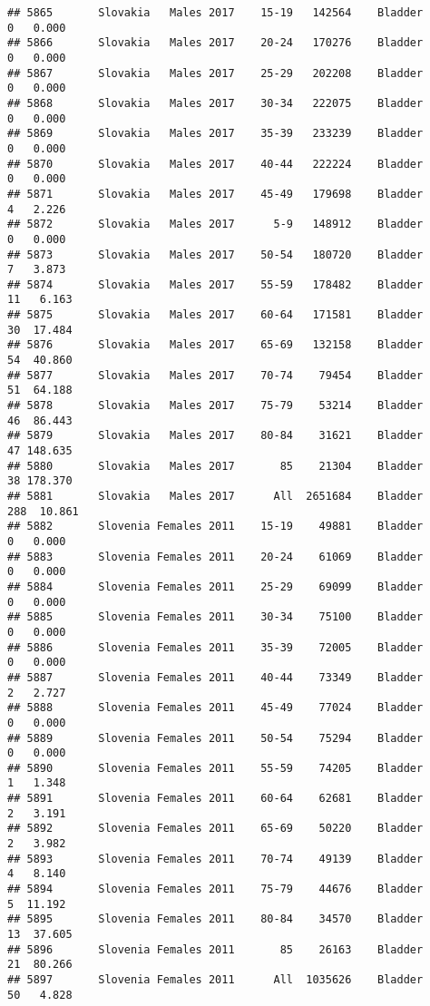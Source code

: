 \documentclass[
]{article}
\begin{document}
\begin{verbatim}
## 5865       Slovakia   Males 2017    15-19   142564    Bladder      0   0.000
## 5866       Slovakia   Males 2017    20-24   170276    Bladder      0   0.000
## 5867       Slovakia   Males 2017    25-29   202208    Bladder      0   0.000
## 5868       Slovakia   Males 2017    30-34   222075    Bladder      0   0.000
## 5869       Slovakia   Males 2017    35-39   233239    Bladder      0   0.000
## 5870       Slovakia   Males 2017    40-44   222224    Bladder      0   0.000
## 5871       Slovakia   Males 2017    45-49   179698    Bladder      4   2.226
## 5872       Slovakia   Males 2017      5-9   148912    Bladder      0   0.000
## 5873       Slovakia   Males 2017    50-54   180720    Bladder      7   3.873
## 5874       Slovakia   Males 2017    55-59   178482    Bladder     11   6.163
## 5875       Slovakia   Males 2017    60-64   171581    Bladder     30  17.484
## 5876       Slovakia   Males 2017    65-69   132158    Bladder     54  40.860
## 5877       Slovakia   Males 2017    70-74    79454    Bladder     51  64.188
## 5878       Slovakia   Males 2017    75-79    53214    Bladder     46  86.443
## 5879       Slovakia   Males 2017    80-84    31621    Bladder     47 148.635
## 5880       Slovakia   Males 2017       85    21304    Bladder     38 178.370
## 5881       Slovakia   Males 2017      All  2651684    Bladder    288  10.861
## 5882       Slovenia Females 2011    15-19    49881    Bladder      0   0.000
## 5883       Slovenia Females 2011    20-24    61069    Bladder      0   0.000
## 5884       Slovenia Females 2011    25-29    69099    Bladder      0   0.000
## 5885       Slovenia Females 2011    30-34    75100    Bladder      0   0.000
## 5886       Slovenia Females 2011    35-39    72005    Bladder      0   0.000
## 5887       Slovenia Females 2011    40-44    73349    Bladder      2   2.727
## 5888       Slovenia Females 2011    45-49    77024    Bladder      0   0.000
## 5889       Slovenia Females 2011    50-54    75294    Bladder      0   0.000
## 5890       Slovenia Females 2011    55-59    74205    Bladder      1   1.348
## 5891       Slovenia Females 2011    60-64    62681    Bladder      2   3.191
## 5892       Slovenia Females 2011    65-69    50220    Bladder      2   3.982
## 5893       Slovenia Females 2011    70-74    49139    Bladder      4   8.140
## 5894       Slovenia Females 2011    75-79    44676    Bladder      5  11.192
## 5895       Slovenia Females 2011    80-84    34570    Bladder     13  37.605
## 5896       Slovenia Females 2011       85    26163    Bladder     21  80.266
## 5897       Slovenia Females 2011      All  1035626    Bladder     50   4.828

\end{verbatim}
\end{document}
